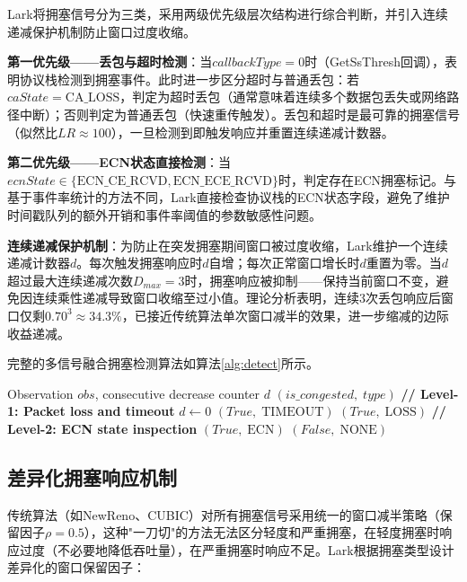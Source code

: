 \documentclass[10pt,twocolumn]{article}
\begin{document}
Lark将拥塞信号分为三类，采用两级优先级层次结构进行综合判断，并引入连续递减保护机制防止窗口过度收缩。

\textbf{第一优先级——丢包与超时检测}：当$callbackType = 0$时（GetSsThresh回调），表明协议栈检测到拥塞事件。此时进一步区分超时与普通丢包：若$caState = \text{CA\_LOSS}$，判定为超时丢包（通常意味着连续多个数据包丢失或网络路径中断）；否则判定为普通丢包（快速重传触发）。丢包和超时是最可靠的拥塞信号（似然比$LR \approx 100$），一旦检测到即触发响应并重置连续递减计数器。

\textbf{第二优先级——ECN状态直接检测}：当$ecnState \in \{\text{ECN\_CE\_RCVD}, \text{ECN\_ECE\_RCVD}\}$时，判定存在ECN拥塞标记。与基于事件率统计的方法不同，Lark直接检查协议栈的ECN状态字段，避免了维护时间戳队列的额外开销和事件率阈值的参数敏感性问题。

\textbf{连续递减保护机制}：为防止在突发拥塞期间窗口被过度收缩，Lark维护一个连续递减计数器$d$。每次触发拥塞响应时$d$自增；每次正常窗口增长时$d$重置为零。当$d$超过最大连续递减次数$D_{max} = 3$时，拥塞响应被抑制——保持当前窗口不变，避免因连续乘性递减导致窗口收缩至过小值。理论分析表明，连续3次丢包响应后窗口仅剩$0.70^3 \approx 34.3\%$，已接近传统算法单次窗口减半的效果，进一步缩减的边际收益递减。

完整的多信号融合拥塞检测算法如算法\ref{alg:detect}所示。

\begin{algorithm}[htbp]
\caption{Multi-Signal Fusion Congestion Detection}
\label{alg:detect}
\small
\begin{algorithmic}[1]
\REQUIRE Observation $obs$, consecutive decrease counter $d$
\ENSURE $(is\_congested, \; type)$
\STATE \textbf{// Level-1: Packet loss and timeout}
    \STATE $d \leftarrow 0$
        \RETURN $(True, \; \text{TIMEOUT})$
    \ELSE
        \RETURN $(True, \; \text{LOSS})$
    \ENDIF
\ENDIF
\STATE \textbf{// Level-2: ECN state inspection}
    \RETURN $(True, \; \text{ECN})$
\ENDIF
\RETURN $(False, \; \text{NONE})$
\end{algorithmic}
\end{algorithm}

\subsection{差异化拥塞响应机制}

传统算法（如NewReno、CUBIC）对所有拥塞信号采用统一的窗口减半策略（保留因子$\rho=0.5$），这种"一刀切"的方法无法区分轻度和严重拥塞，在轻度拥塞时响应过度（不必要地降低吞吐量），在严重拥塞时响应不足。Lark根据拥塞类型设计差异化的窗口保留因子：
\end{document}
